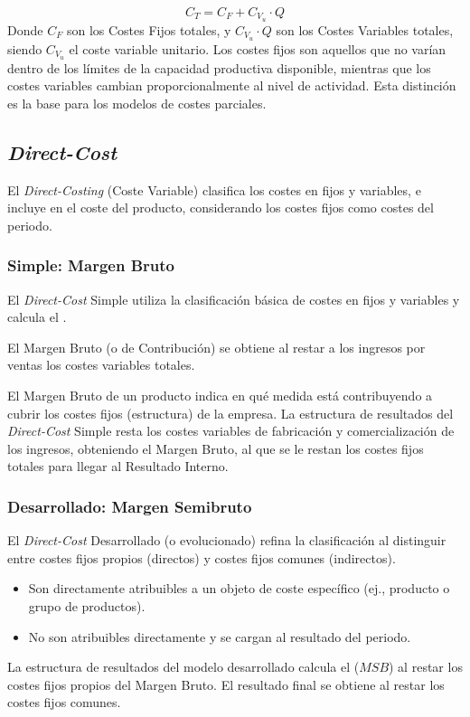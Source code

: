 $$
C_T = C_F + C_{V_u} \cdot Q
$$
Donde $C_F$ son los Costes Fijos totales, y $C_{V_u} \cdot Q$ son los Costes Variables totales, siendo $C_{V_u}$ el coste variable unitario. Los costes fijos son aquellos que no varían dentro de los límites de la capacidad productiva disponible, mientras que los costes variables cambian proporcionalmente al nivel de actividad. Esta distinción es la base para los modelos de costes parciales.

\subsection{\textit{Direct-Cost}}

El \textit{Direct-Costing} (Coste Variable) clasifica los costes en fijos y variables, e incluye  en el coste del producto, considerando los costes fijos como costes del periodo.

\subsubsection{Simple: Margen Bruto}

El \textit{Direct-Cost} Simple utiliza la clasificación básica de costes en fijos y variables y calcula el .

\begin{definicion}
El Margen Bruto (o de Contribución) se obtiene al restar a los ingresos por ventas los costes variables totales.
\end{definicion}

El Margen Bruto de un producto indica en qué medida está contribuyendo a cubrir los costes fijos (estructura) de la empresa. La estructura de resultados del \textit{Direct-Cost} Simple resta los costes variables de fabricación y comercialización de los ingresos, obteniendo el Margen Bruto, al que se le restan los costes fijos totales para llegar al Resultado Interno.

\subsubsection{Desarrollado: Margen Semibruto}

El \textit{Direct-Cost} Desarrollado (o evolucionado) refina la clasificación al distinguir entre costes fijos propios (directos) y costes fijos comunes (indirectos).

\begin{itemize}
    \item {} Son directamente atribuibles a un objeto de coste específico (ej., producto o grupo de productos).
    \item {} No son atribuibles directamente y se cargan al resultado del periodo.
\end{itemize}
La estructura de resultados del modelo desarrollado calcula el  ($MSB$) al restar los costes fijos propios del Margen Bruto. El resultado final se obtiene al restar los costes fijos comunes.

